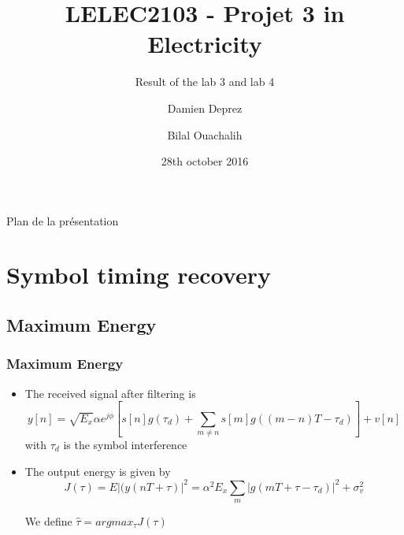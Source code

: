 \documentclass[11pt]{beamer}
\title{LELEC2103 - Projet 3 in Electricity}
\subtitle[\ldots]{Result of the lab 3 and lab 4}
\author[D. Deprez\and B. Ouachalih]{Damien Deprez\and Bilal Ouachalih}
\institute{EPL}
\date{28th october 2016}
\begin{document}
{
	\begin{frame}[noframenumbering]
		\titlepage
	\end{frame}
} 

{
	\begin{frame}[noframenumbering]{Plan de la présentation}
		\tableofcontents
	\end{frame}
}

\section{Symbol timing recovery}

\subsection{Maximum Energy}

\begin{frame}
\frametitle{Maximum Energy}

\begin{itemize}
\item The received signal after filtering is 
\begin{equation}
y[n] = \sqrt{E_x}\alpha e^{j\phi} \left[s[n]g(\tau_d)+\sum_{m \neq n} s[m] g((m-n)T-\tau_d)\right]+ v[n]
\end{equation}
with $\tau_d$ is the symbol interference

\item The output energy is given by
\begin{equation}
J(\tau) = E|(y(nT+\tau)|^2= \alpha^2 E_x \sum_m |g(mT+\tau-\tau_d)|^2 + \sigma_v ^2
\end{equation}

We define $\hat{\tau}=argmax_{\tau} J(\tau)$

\end{itemize}   

\end{frame}
\end{document}
